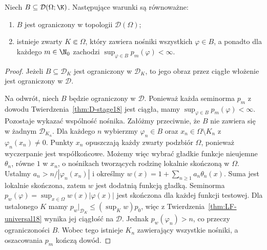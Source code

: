 \begin{twierdzenie}
\label{thm:D-bounded18}
Niech $B\subseteq\mathcal D(\Omega;\K)$. Następujące
warunki są równoważne:
\begin{enumerate}
\item $B$ jest ograniczony w topologii $\mathcal D(\Omega)$;
\item istnieje zwarty $K\Subset\Omega$, który zawiera
nośniki wszystkich $\varphi\in B$, a ponadto dla każdego
$m\in\N_0$ zachodzi $\sup_{\varphi\in B}p_m(\varphi)<\infty$.
\end{enumerate}
\end{twierdzenie}
\begin{proof}
Jeżeli $B\subseteq\mathcal D_K$ jest ograniczony w
$\mathcal D_K$, to jego obraz przez ciągłe włożenie
jest ograniczony w $\mathcal D$.

Na odwrót, niech $B$ będzie ograniczony w $\mathcal D$.
Ponieważ każda seminorma $p_m$ z dowodu
Twierdzenia~\ref{thm:D-stage18} jest ciągła, mamy
$\sup_{\varphi\in B}p_m(\varphi)<\infty$.
Pozostaje wykazać wspólność nośnika. Załóżmy przeciwnie,
że $B$ nie zawiera się w żadnym $\mathcal D_{K_n}$.
Dla każdego $n$ wybierzmy $\varphi_n\in B$ oraz
$x_n\in\Omega\setminus K_n$ z $\varphi_n(x_n)\ne0$.
Punkty $x_n$ opuszczają każdy zwarty podzbiór $\Omega$,
ponieważ wyczerpanie jest współkońcowe. Możemy więc
wybrać gładkie funkcje nieujemne $\theta_n$, równe $1$
w $x_n$, o nośnikach tworzących rodzinę lokalnie skończoną
w $\Omega$. Ustalmy $a_n>n/|\varphi_n(x_n)|$ i określmy
$w(x)=1+\sum_{n\ge1}a_n\theta_n(x)$. Suma jest lokalnie
skończona, zatem $w$ jest dodatnią funkcją gładką.
Seminorma $p_w(\varphi)=\sup_{x\in\Omega}w(x)|\varphi(x)|$
jest skończona dla każdej funkcji testowej. Dla ustalonego
$K$ mamy $p_w|_{\mathcal D_K}\le(\sup_Kw)p_0$, więc
z Twierdzenia~\ref{thm:LF-universal18} wynika jej ciągłość
na $\mathcal D$. Jednak $p_w(\varphi_n)>n$,
co przeczy ograniczoności $B$. Wobec tego istnieje
$K_n$ zawierający wszystkie nośniki, a oszacowania
$p_m$ kończą dowód.
\end{proof}

